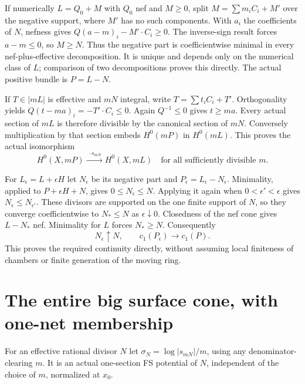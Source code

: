\documentclass[11pt]{article}
\begin{document}
If numerically $L=Q_0+M$ with $Q_0$ nef and $M\geq0$, split
$M=\sum m_iC_i+M'$ over the negative support, where $M'$ has no
such components. With $a_i$ the coefficients of $N$, nefness gives
$Q(a-m)_i-M'\cdot C_i\geq0$.
The inverse-sign result forces $a-m\leq0$, so $M\geq N$.
Thus the negative part is coefficientwise minimal in every
nef-plus-effective decomposition. It is unique and depends only
on the numerical class of $L$; comparison of two decompositions
proves this directly. The actual positive bundle is $P=L-N$.

If $T\in|mL|$ is effective and $mN$ integral, write
$T=\sum t_iC_i+T'$. Orthogonality yields
$Q(t-ma)_i=-T'\cdot C_i\leq0$.
Again $Q^{-1}\leq0$ gives $t\geq ma$. Every actual section of
$mL$ is therefore divisible by the canonical section of $mN$.
Conversely multiplication by that section embeds $H^0(mP)$ in
$H^0(mL)$. This proves the actual isomorphism
\[
 H^0(X,mP)\xrightarrow{\ \cdot s_{mN}\ }H^0(X,mL)
                   \quad\text{for all sufficiently divisible }m.
                                                               \tag{4}
\]

For $L_\epsilon=L+\epsilon H$ let $N_\epsilon$ be its negative
part and $P_\epsilon=L_\epsilon-N_\epsilon$.
Minimality, applied to $P+\epsilon H+N$, gives
$0\leq N_\epsilon\leq N$. Applying it again when
$0<\epsilon'<\epsilon$ gives $N_\epsilon\leq N_{\epsilon'}$.
These divisors are supported on the one finite support of $N$,
so they converge coefficientwise to $N_*\leq N$ as
$\epsilon\downarrow0$. Closedness of the nef cone gives
$L-N_*$ nef. Minimality for $L$ forces $N_*\geq N$.
Consequently
\[
 N_\epsilon\uparrow N,\qquad c_1(P_\epsilon)\to c_1(P).
                                                               \tag{5}
\]
This proves the required continuity directly, without assuming
local finiteness of chambers or finite generation of the moving ring.

\section{The entire big surface cone, with one-net membership}
For an effective rational divisor $N$ let
$\sigma_N=\log|s_{mN}|/m$, using any denominator-clearing $m$.
It is an actual one-section FS potential of $N$, independent of
the choice of $m$, normalized at $x_0$.
\end{document}
